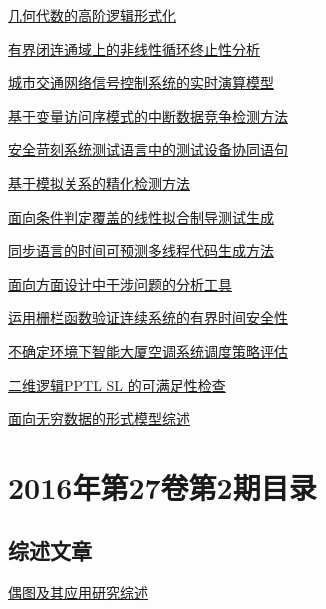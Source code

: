 \documentclass[a4paper]{article}
\begin{document}
\href{http://www.jos.org.cn/ch/reader/download_pdf.aspx?file_no=4977&year_id=2016&quarter_id=3&falg=1}{几何代数的高阶逻辑形式化}

\href{http://www.jos.org.cn/ch/reader/download_pdf.aspx?file_no=4978&year_id=2016&quarter_id=3&falg=1}{有界闭连通域上的非线性循环终止性分析}

\href{http://www.jos.org.cn/ch/reader/download_pdf.aspx?file_no=4979&year_id=2016&quarter_id=3&falg=1}{城市交通网络信号控制系统的实时演算模型}

\href{http://www.jos.org.cn/ch/reader/download_pdf.aspx?file_no=4980&year_id=2016&quarter_id=3&falg=1}{基于变量访问序模式的中断数据竞争检测方法}

\href{http://www.jos.org.cn/ch/reader/download_pdf.aspx?file_no=4981&year_id=2016&quarter_id=3&falg=1}{安全苛刻系统测试语言中的测试设备协同语句}

\href{http://www.jos.org.cn/ch/reader/download_pdf.aspx?file_no=4982&year_id=2016&quarter_id=3&falg=1}{基于模拟关系的精化检测方法}

\href{http://www.jos.org.cn/ch/reader/download_pdf.aspx?file_no=4983&year_id=2016&quarter_id=3&falg=1}{面向条件判定覆盖的线性拟合制导测试生成}

\href{http://www.jos.org.cn/ch/reader/download_pdf.aspx?file_no=4984&year_id=2016&quarter_id=3&falg=1}{同步语言的时间可预测多线程代码生成方法}

\href{http://www.jos.org.cn/ch/reader/download_pdf.aspx?file_no=4985&year_id=2016&quarter_id=3&falg=1}{面向方面设计中干涉问题的分析工具}

\href{http://www.jos.org.cn/ch/reader/download_pdf.aspx?file_no=4986&year_id=2016&quarter_id=3&falg=1}{运用栅栏函数验证连续系统的有界时间安全性}

\href{http://www.jos.org.cn/ch/reader/download_pdf.aspx?file_no=4987&year_id=2016&quarter_id=3&falg=1}{不确定环境下智能大厦空调系统调度策略评估}

\href{http://www.jos.org.cn/ch/reader/download_pdf.aspx?file_no=4988&year_id=2016&quarter_id=3&falg=1}{二维逻辑PPTL SL 的可满足性检查}

\href{http://www.jos.org.cn/ch/reader/download_pdf.aspx?file_no=4989&year_id=2016&quarter_id=3&falg=1}{面向无穷数据的形式模型综述}


\section{\textbf{2016年第27卷第2期目录}}
\subsection{综述文章}
\href{http://www.jos.org.cn/ch/reader/download_pdf.aspx?file_no=4939&year_id=2016&quarter_id=2&falg=1}{偶图及其应用研究综述}
\end{document}
